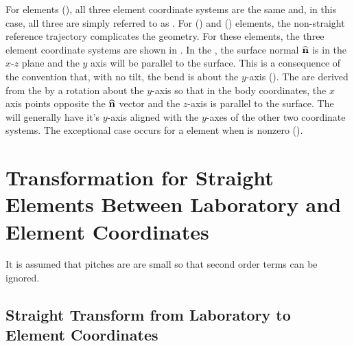 For  elements (), all three element
coordinate systems are the same and, in this case, all three are
simply referred to as .  For 
() and  () elements, the
non-straight reference trajectory complicates the geometry. For these
elements, the three element coordinate systems are shown in
. In the , the surface normal ${\widehat{\bf n}}$ is in the $x$-$z$ plane
and the $y$ axis will be parallel to the surface. This is a
consequence of the convention that, with no tilt, the bend is about
the $y$-axis (). The  are
derived from the  by a rotation about
the $y$-axis so that in the body coordinates, the $x$ axis points
opposite the ${\widehat{\bf n}}$ vector and the $z$-axis is parallel to the
surface. The  will generally have it's
$y$-axis aligned with the $y$-axes of the other two coordinate
systems. The exceptional case occurs for a  element when
 is nonzero ().

\section{Transformation for Straight Elements Between 
Laboratory and Element Coordinates}
\label{s:straight.lab.ele}

It is assumed that pitches are are small so that second
order terms can be ignored.

\subsection{Straight Transform from Laboratory to Element Coordinates}

